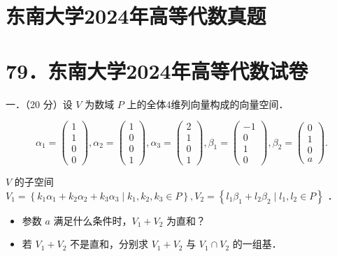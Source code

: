 \documentclass{article}
\begin{document}
\section*{东南大学2024年高等代数真题}
\section*{79．东南大学2024年高等代数试卷}
一．（20 分）设 \(V\) 为数域 \(P\) 上的全体4维列向量构成的向量空间．

\[
\alpha_{1}=\left(\begin{array}{l}
1 \\
1 \\
0 \\
0
\end{array}\right), \alpha_{2}=\left(\begin{array}{l}
1 \\
0 \\
0 \\
1
\end{array}\right), \alpha_{3}=\left(\begin{array}{l}
2 \\
1 \\
0 \\
1
\end{array}\right), \beta_{1}=\left(\begin{array}{c}
-1 \\
0 \\
1 \\
0
\end{array}\right), \beta_{2}=\left(\begin{array}{l}
0 \\
1 \\
0 \\
a
\end{array}\right) .
\]

\(V\) 的子空间 \(V_{1}=\left\{k_{1} \alpha_{1}+k_{2} \alpha_{2}+k_{3} \alpha_{3} \mid k_{1}, k_{2}, k_{3} \in P\right\}, V_{2}=\left\{l_{1} \beta_{1}+l_{2} \beta_{2} \mid l_{1}, l_{2} \in P\right\}\) ．

\begin{itemize}

  \item[1．] 参数 \(a\) 满足什么条件时，\(V_{1}+V_{2}\) 为直和？

  \item[2．] 若 \(V_{1}+V_{2}\) 不是直和，分别求 \(V_{1}+V_{2}\) 与 \(V_{1} \cap V_{2}\) 的一组基．
\end{itemize}
\end{document}
